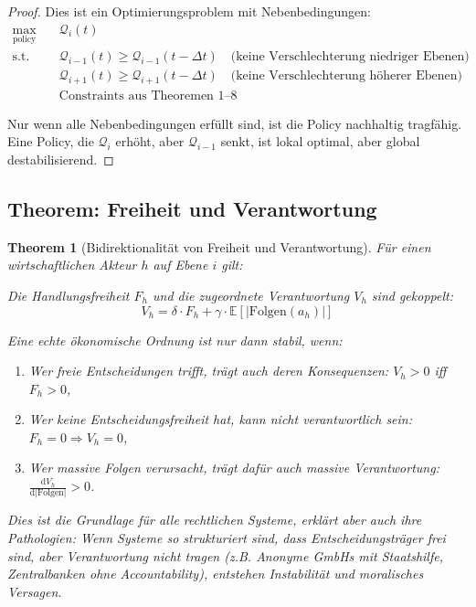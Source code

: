 \documentclass[a4paper, 12pt, twoside, openright]{report}
\newtheorem{theorem}{Theorem}[section]
\theoremstyle{definition}
\theoremstyle{definition}
\begin{document}
\begin{proof}
Dies ist ein Optimierungsproblem mit Nebenbedingungen:
\begin{align}
\max_{\text{policy}} \quad &\mathcal{Q}_i(t) \\
\text{s.t.} \quad &\mathcal{Q}_{i-1}(t) \geq \mathcal{Q}_{i-1}(t-\Delta t) \quad \text{(keine Verschlechterung niedriger Ebenen)} \\
&\mathcal{Q}_{i+1}(t) \geq \mathcal{Q}_{i+1}(t-\Delta t) \quad \text{(keine Verschlechterung höherer Ebenen)} \\
&\text{Constraints aus Theoremen 1--8}
\end{align}

Nur wenn alle Nebenbedingungen erfüllt sind, ist die Policy nachhaltig tragfähig. Eine Policy, die $\mathcal{Q}_i$ erhöht, aber $\mathcal{Q}_{i-1}$ senkt, ist lokal optimal, aber global destabilisierend.
\end{proof}

\subsection{Theorem: Freiheit und Verantwortung}

\begin{theorem}[Bidirektionalität von Freiheit und Verantwortung]
\label{thm:freiheit-verantwortung}
Für einen wirtschaftlichen Akteur $h$ auf Ebene $i$ gilt:

Die Handlungsfreiheit $F_h$ und die zugeordnete Verantwortung $V_h$ sind gekoppelt:
\begin{equation}
V_h = \delta \cdot F_h + \gamma \cdot \mathbb{E}[|\text{Folgen}(a_h)|]
\end{equation}

Eine echte ökonomische Ordnung ist nur dann stabil, wenn:
\begin{enumerate}
\item Wer freie Entscheidungen trifft, trägt auch deren Konsequenzen: $V_h > 0$ iff $F_h > 0$,
\item Wer keine Entscheidungsfreiheit hat, kann nicht verantwortlich sein: $F_h = 0 \Rightarrow V_h = 0$,
\item Wer massive Folgen verursacht, trägt dafür auch massive Verantwortung: $\frac{\mathrm{d}V_h}{\mathrm{d}|\text{Folgen}|} > 0$.
\end{enumerate}

Dies ist die Grundlage für alle rechtlichen Systeme, erklärt aber auch ihre Pathologien: Wenn Systeme so strukturiert sind, dass Entscheidungsträger frei sind, aber Verantwortung nicht tragen (z.B. Anonyme GmbHs mit Staatshilfe, Zentralbanken ohne Accountability), entstehen Instabilität und moralisches Versagen.
\end{theorem}
\end{document}
